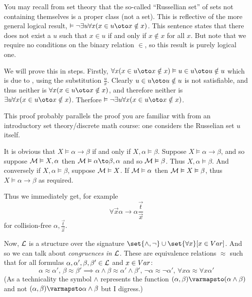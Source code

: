 \bexam

    You may recall from set theory that the so-called ``Russellian set'' of sets not containing themselves is a proper class (not a set).
    This is reflective of the more general logical result, $\vDash\neg\exists u\forall x(x\in u\oto x\notin x)$.
    This sentence states that there does not exist a $u$ such that $x\in u$ if and only if $x\notin x$ for all $x$.
    But note that we require no conditions on the binary relation $\in$, so this result is purely logical one.

    We will prove this in steps.
    Firstly, $\forall x(x\in u\oto x\notin x)\vDash u\in u\oto u\notin u$ which is due to , using the substitution $\frac ux$.
    Clearly $u\in u\oto u\notin u$ is not satisfiable, and thus neither is $\forall x(x\in u\oto x\notin x)$, and therefore neither is $\exists u\forall x(x\in u\oto x\notin x)$.
    Therfore $\vDash\neg\exists u\forall x(x\in u\oto x\notin x)$.

    This proof probably parallels the proof you are familiar with from an introductory set theory/discrete math course: one considers the Russelian set $u$ itself.

\eexam

It is obvious that $X\vDash\alpha\to\beta$ if and only if $X,\alpha\vDash\beta$.
Suppose $X\vDash\alpha\to\beta$, and so suppose ${\cal M}\vDash X,\alpha$ then ${\cal M}\vDash\alpha\to\beta,\alpha$ and so ${\cal M}\vDash\beta$.
Thus $X,\alpha\vDash\beta$.
And conversely if $X,\alpha\vDash\beta$, suppose ${\cal M}\vDash X$.
If ${\cal M}\vDash\alpha$ then ${\cal M}\vDash X\vDash\beta$, thus $X\vDash\alpha\to\beta$ as required.

Thus we immediately get, for example
$$ \forall\vec x\alpha\to\alpha\frac{\vec t}{\vec x} $$
for collision-free $\alpha,\frac{\vec t}{\vec x}$.

Now, ${\cal L}$ is a structure over the signature $\set{\land,\neg}\cup\set{\forall x}[x\in\Var]$.
And so we can talk about {\it congruences in ${\cal L}$}.
These are equivalence relations $\approx$ such that for all formulas $\alpha,\alpha',\beta,\beta'\in{\cal L}$ and $x\in{\sl Var}$:
$$ \alpha\approx\alpha',\,\beta\approx\beta' \implies \alpha\land\beta\approx\alpha'\land\beta',\,\neg\alpha\approx\neg\alpha',\,\forall x\alpha\approx\forall x\alpha' $$
(As a technicality the symbol $\land$ represents the function $(\alpha,\beta)\varmapsto(\alpha\land\beta)$ and not $(\alpha,\beta)\varmapsto\alpha\land\beta$ but I digress.)

